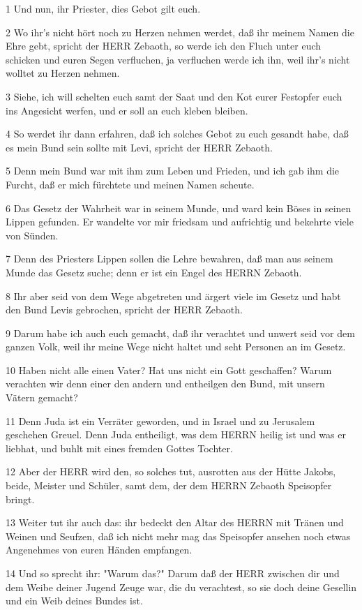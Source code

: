 \par 1 Und nun, ihr Priester, dies Gebot gilt euch.
\par 2 Wo ihr's nicht hört noch zu Herzen nehmen werdet, daß ihr meinem Namen die Ehre gebt, spricht der HERR Zebaoth, so werde ich den Fluch unter euch schicken und euren Segen verfluchen, ja verfluchen werde ich ihn, weil ihr's nicht wolltet zu Herzen nehmen.
\par 3 Siehe, ich will schelten euch samt der Saat und den Kot eurer Festopfer euch ins Angesicht werfen, und er soll an euch kleben bleiben.
\par 4 So werdet ihr dann erfahren, daß ich solches Gebot zu euch gesandt habe, daß es mein Bund sein sollte mit Levi, spricht der HERR Zebaoth.
\par 5 Denn mein Bund war mit ihm zum Leben und Frieden, und ich gab ihm die Furcht, daß er mich fürchtete und meinen Namen scheute.
\par 6 Das Gesetz der Wahrheit war in seinem Munde, und ward kein Böses in seinen Lippen gefunden. Er wandelte vor mir friedsam und aufrichtig und bekehrte viele von Sünden.
\par 7 Denn des Priesters Lippen sollen die Lehre bewahren, daß man aus seinem Munde das Gesetz suche; denn er ist ein Engel des HERRN Zebaoth.
\par 8 Ihr aber seid von dem Wege abgetreten und ärgert viele im Gesetz und habt den Bund Levis gebrochen, spricht der HERR Zebaoth.
\par 9 Darum habe ich auch euch gemacht, daß ihr verachtet und unwert seid vor dem ganzen Volk, weil ihr meine Wege nicht haltet und seht Personen an im Gesetz.
\par 10 Haben nicht alle einen Vater? Hat uns nicht ein Gott geschaffen? Warum verachten wir denn einer den andern und entheilgen den Bund, mit unsern Vätern gemacht?
\par 11 Denn Juda ist ein Verräter geworden, und in Israel und zu Jerusalem geschehen Greuel. Denn Juda entheiligt, was dem HERRN heilig ist und was er liebhat, und buhlt mit eines fremden Gottes Tochter.
\par 12 Aber der HERR wird den, so solches tut, ausrotten aus der Hütte Jakobs, beide, Meister und Schüler, samt dem, der dem HERRN Zebaoth Speisopfer bringt.
\par 13 Weiter tut ihr auch das: ihr bedeckt den Altar des HERRN mit Tränen und Weinen und Seufzen, daß ich nicht mehr mag das Speisopfer ansehen noch etwas Angenehmes von euren Händen empfangen.
\par 14 Und so sprecht ihr: "Warum das?" Darum daß der HERR zwischen dir und dem Weibe deiner Jugend Zeuge war, die du verachtest, so sie doch deine Gesellin und ein Weib deines Bundes ist.
